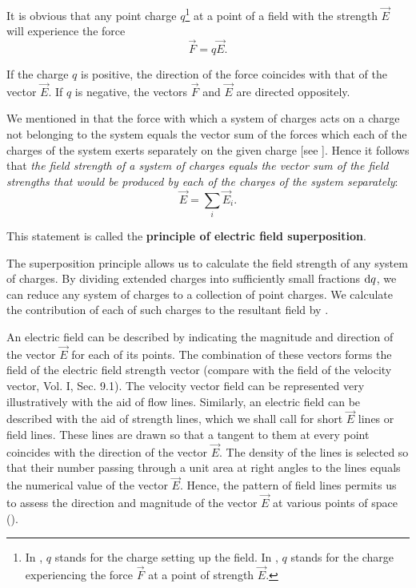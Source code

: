 \noindent
It is obvious that any point charge $q$\footnote{In , $q$ stands for the charge setting up the field. In , $q$ stands for the charge experiencing the force $\vec{F}$ at a point of strength $\vec{E}$.} at a point of a field with the strength $\vec{E}$ will experience the force
\begin{equation}\label{eq:1_18}
	\vec{F} = q \vec{E}.
\end{equation}

\noindent
If the charge $q$ is positive, the direction of the force coincides with that of the vector $\vec{E}$. If $q$ is negative, the vectors $\vec{F}$ and $\vec{E}$ are directed oppositely.

We mentioned in  that the force with which a system of charges acts on a charge not belonging to the system equals the vector sum of the forces which each of the charges of the system exerts separately on the given charge [see ]. Hence it follows that \textit{the field strength of a system of charges equals the vector sum of the field strengths that would be produced by each of the charges of the system separately}:
\vspace{-12pt}
\begin{equation}\label{eq:1_19}
	\vec{E} = \sum_i \vec{E}_i.
\end{equation}

\noindent
This statement is called the \textbf{principle of electric field superposition}.

The superposition principle allows us to calculate the field strength of any system of charges. By dividing extended charges into sufficiently
small fractions $\mathrm{d} q$, we can reduce any system of charges to a collection of point charges. We calculate the contribution of each of such charges to the resultant field by .

An electric field can be described by indicating the magnitude and direction of the vector $\vec{E}$ for each of its points. The combination of these vectors forms the field of the electric field strength vector (compare with the field of the velocity vector, Vol. I, Sec. 9.1). The velocity vector field can be represented very illustratively with the aid of flow lines. Similarly, an electric field can be described with the aid of strength lines, which we shall call for short $\vec{E}$ lines or field lines. These lines are drawn so that a tangent to them at every point coincides with the direction of the vector $\vec{E}$. The density of the lines is selected so that their number passing through a unit area at right angles to the lines equals the numerical value of the vector $\vec{E}$. Hence, the pattern of field lines permits us to assess the direction and magnitude of the vector $\vec{E}$ at various points of space ().

